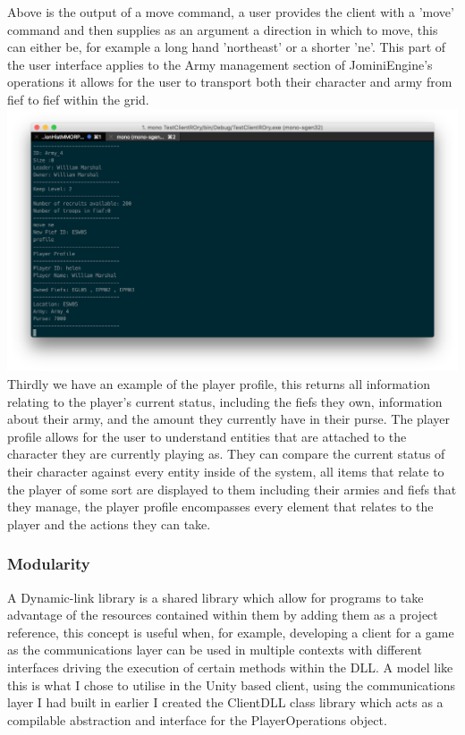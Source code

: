 \documentclass{article}
\begin{document}
Above is the output of a move command, a user provides the client with a 'move' command and then supplies as an argument a direction in which to move, this can either be, for example a long hand 'northeast' or a shorter 'ne'. This part of the user interface applies to the Army management section of JominiEngine's operations it allows for the user to transport both their character and army from fief to fief within the grid.\\
\includegraphics[width=\textwidth]{text5.png}
Thirdly we have an example of the player profile, this returns all information relating to the player's current status, including the fiefs they own, information about their army, and the amount they currently have in their purse. The player profile allows for the user to understand entities that are attached to the character they are currently playing as. They can compare the current status of their character against every entity inside of the system, all items that relate to the player of some sort are displayed to them including their armies and fiefs that they manage, the player profile encompasses every element that relates to the player and the actions they can take.
\subsubsection{Modularity}
A Dynamic-link library is a shared library which allow for programs to take advantage of the resources contained within them by adding them as a project reference, this concept is useful when, for example, developing a client for a game as the communications layer can be used in multiple contexts with different interfaces driving the execution of certain methods within the DLL. A model like this is what I chose to utilise in the Unity based client, using the communications layer I had built in earlier I created the ClientDLL class library which acts as a compilable abstraction and interface for the PlayerOperations object.
\end{document}
